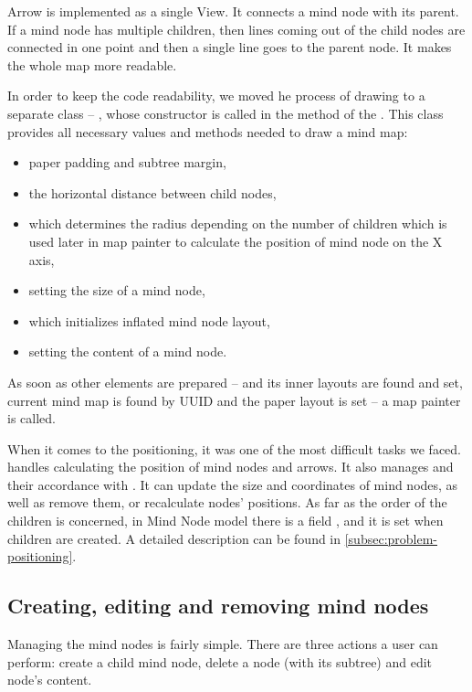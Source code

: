 Arrow is implemented as a single View. It connects a mind node with its parent. If a mind node has multiple children, then lines coming out of the child nodes are connected in one point and then a single line goes to the parent node. It makes the whole map more readable. 

In order to keep the code readability, we moved he process of drawing to a separate class -- , whose constructor is called in the  method of the . This class provides all necessary values and methods needed to draw a mind map:
\begin{itemize}
	\item paper padding and  subtree margin,
	\item the horizontal distance between child nodes,
	\item {} which determines the radius depending on the number of children which is used later in map painter to calculate the position of mind node on the X axis,
	\item {} setting the size of a mind node,
	\item {} which initializes inflated mind node layout,
	\item {} setting the content of a mind node.
\end{itemize}
 As soon as other elements are prepared --   and its inner  layouts are found and set, current mind map is found by UUID	 and the paper layout is set -- a map painter is called. 

When it comes to the positioning, it was one of the most difficult tasks we faced.  handles calculating the position of mind nodes and arrows. It also manages  and their accordance with . It can update the size and coordinates of mind nodes, as well as remove them, or recalculate nodes' positions. As far as the order of the children is concerned, in Mind Node model there is a field , and it is set when children are created. A detailed description can be found in \cref{subsec:problem-positioning}.

\subsection{Creating, editing and removing mind nodes}
\label{subsec:drawing}
Managing the mind nodes is fairly simple. There are three actions a user can perform:  create a child mind node, delete a node (with its subtree) and edit node's content. 

